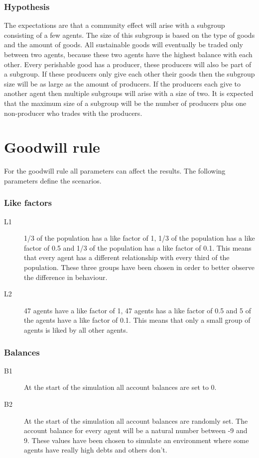 \documentclass[twoside,openright]{uva-bachelor-thesis}
\begin{document}
\subsubsection{Hypothesis}
The expectations are that a community effect will arise with a subgroup consisting of a few agents. The size of this subgroup is based on the type of goods and the amount of goods. All sustainable goods will eventually be traded only between two agents, because these two agents have the highest balance with each other. Every perishable good has a producer, these producers will also be part of a subgroup. If these producers only give each other their goods then the subgroup size will be as large as the amount of producers. If the producers each give to another agent then multiple subgroups will arise with a size of two. It is expected that the maximum size of a subgroup will be the number of producers plus one non-producer who trades with the producers.

\section{Goodwill rule}
For the goodwill rule all parameters can affect the results. The following parameters define the scenarios.
\subsubsection{Like factors}
\begin{description}
\item[L1]	1/3 of the population has a like factor of 1, 1/3 of the population has a like factor of 0.5 and 1/3 of the population has a like factor of 0.1. This means that every agent has a different relationship with every third of the population. These three groups have been chosen in order to better observe the difference in behaviour.
\item[L2]	47 agents have a like factor of 1, 47 agents has a like factor of 0.5 and 5 of the agents have a like factor of 0.1. This means that only a small group of agents is liked by all other agents.
\end{description}
\subsubsection{Balances}
\begin{description}
\item[B1]	At the start of the simulation all account balances are set to 0.
\item[B2]	At the start of the simulation all account balances are randomly set. The account balance for every agent will be a natural number between -9 and 9. These values have been chosen to simulate an environment where some agents have really high debts and others don't.
\end{description}
\end{document}

